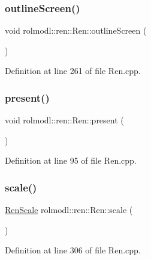 \subsubsection{\texorpdfstring{outlineScreen()}{outlineScreen()}}
{\footnotesize\ttfamily void rolmodl\+::ren\+::\+Ren\+::outline\+Screen (\begin{DoxyParamCaption}{ }\end{DoxyParamCaption})}



Definition at line 261 of file Ren.\+cpp.

\mbox{\label{classrolmodl_1_1blend_mode_1_1_ren_a95ae9d85d0b4d45dfb447096b1b55332}} 
\subsubsection{\texorpdfstring{present()}{present()}}
{\footnotesize\ttfamily void rolmodl\+::ren\+::\+Ren\+::present (\begin{DoxyParamCaption}{ }\end{DoxyParamCaption})\hspace{0.3cm}{\ttfamily [noexcept]}}



Definition at line 95 of file Ren.\+cpp.

\mbox{\label{classrolmodl_1_1blend_mode_1_1_ren_aa064cf7c4b1e30ff3915afdec061689b}} 
\subsubsection{\texorpdfstring{scale()}{scale()}}
{\footnotesize\ttfamily \mbox{\hyperlink{structrolmodl_1_1blend_mode_1_1_ren_scale}{Ren\+Scale}} rolmodl\+::ren\+::\+Ren\+::scale (\begin{DoxyParamCaption}{ }\end{DoxyParamCaption})\hspace{0.3cm}{\ttfamily [noexcept]}}



Definition at line 306 of file Ren.\+cpp.

\mbox{\label{classrolmodl_1_1blend_mode_1_1_ren_a75df23fec97e212c0a266fe6158a460e}} 
